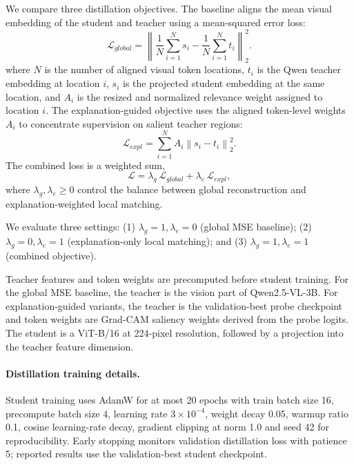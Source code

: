\documentclass{article}
\begin{document}
We compare three distillation objectives.
The baseline aligns the mean visual embedding of the student and teacher using a mean-squared error loss:
\begin{equation}
  \mathcal{L}_{global} = \left\lVert \frac{1}{N}\sum_{i=1}^{N} s_i - \frac{1}{N}\sum_{i=1}^{N} t_i \right\rVert_2^2.
\end{equation}
where $N$ is the number of aligned visual token locations, $t_i$ is the Qwen teacher embedding at location $i$, $s_i$ is the projected student embedding at the same location, and $A_i$ is the resized and normalized relevance weight assigned to location $i$.
The explanation-guided objective uses the aligned token-level weights $A_i$ to concentrate supervision on salient teacher regions:
\begin{equation}
  \mathcal{L}_{expl} = \sum_{i=1}^{N} A_i \left\lVert s_i - t_i \right\rVert_2^2.
\end{equation}
The combined loss is a weighted sum,
\begin{equation}
  \mathcal{L} = \lambda_g\,\mathcal{L}_{global} + \lambda_e\,\mathcal{L}_{expl},
\end{equation}
where $\lambda_g, \lambda_e \ge 0$ control the balance between global reconstruction and explanation-weighted local matching. 

We evaluate three settings: (1) $\lambda_g=1, \lambda_e=0$ (global MSE baseline); (2) $\lambda_g=0, \lambda_e=1$ (explanation-only local matching); and (3) $\lambda_g=1, \lambda_e=1$ (combined objective).

Teacher features and token weights are precomputed before student training.
For the global MSE baseline, the teacher is the vision part of Qwen2.5-VL-3B.
For explanation-guided variants, the teacher is the validation-best probe checkpoint and token weights are Grad-CAM saliency weights derived from the probe logits.
The student is a ViT-B/16 at 224-pixel resolution, followed by a projection into the teacher feature dimension.

\paragraph{Distillation training details.}
Student training uses AdamW for at most 20 epochs with train batch size 16, precompute batch size 4, learning rate $3\times10^{-4}$, weight decay 0.05, warmup ratio 0.1, cosine learning-rate decay, gradient clipping at norm 1.0 and seed 42 for reproducibility.
Early stopping monitors validation distillation loss with patience 5; reported results use the validation-best student checkpoint.
\end{document}
